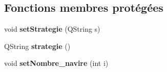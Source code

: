 \subsection*{Fonctions membres protégées}
\begin{DoxyCompactItemize}
\item 
void {\bfseries set\+Strategie} (Q\+String s)\hypertarget{class_launcher_a275bb65345df87d43fb618bf9a586ed7}{}\label{class_launcher_a275bb65345df87d43fb618bf9a586ed7}

\item 
Q\+String {\bfseries strategie} ()\hypertarget{class_launcher_a997d7229e1aec8b3ef3901cdb1bb9c72}{}\label{class_launcher_a997d7229e1aec8b3ef3901cdb1bb9c72}

\item 
void {\bfseries set\+Nombre\+\_\+navire} (int i)\hypertarget{class_launcher_a39ca36b788d9b2ce1ee530f2be10d1ff}{}\label{class_launcher_a39ca36b788d9b2ce1ee530f2be10d1ff}

\end{DoxyCompactItemize}

